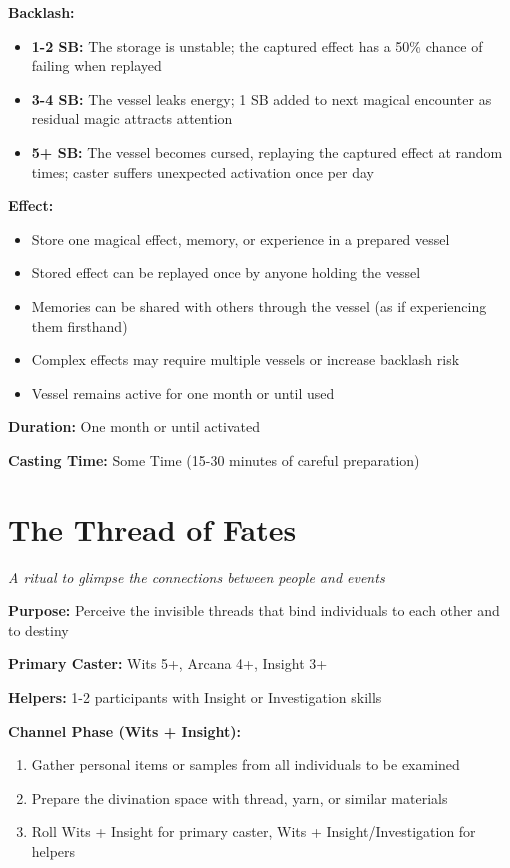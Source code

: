 \textbf{Backlash:}
\begin{itemize}
\item \textbf{1-2 SB:} The storage is unstable; the captured effect has a 50\% chance of failing when replayed
\item \textbf{3-4 SB:} The vessel leaks energy; 1 SB added to next magical encounter as residual magic attracts attention
\item \textbf{5+ SB:} The vessel becomes cursed, replaying the captured effect at random times; caster suffers unexpected activation once per day
\end{itemize}

\textbf{Effect:}
\begin{itemize}
\item Store one magical effect, memory, or experience in a prepared vessel
\item Stored effect can be replayed once by anyone holding the vessel
\item Memories can be shared with others through the vessel (as if experiencing them firsthand)
\item Complex effects may require multiple vessels or increase backlash risk
\item Vessel remains active for one month or until used
\end{itemize}

\textbf{Duration:} One month or until activated

\textbf{Casting Time:} Some Time (15-30 minutes of careful preparation)

\section*{The Thread of Fates}
\textit{A ritual to glimpse the connections between people and events}

\textbf{Purpose:} Perceive the invisible threads that bind individuals to each other and to destiny

\textbf{Primary Caster:} Wits 5+, Arcana 4+, Insight 3+

\textbf{Helpers:} 1-2 participants with Insight or Investigation skills

\textbf{Channel Phase (Wits + Insight):}
\begin{enumerate}
\item Gather personal items or samples from all individuals to be examined
\item Prepare the divination space with thread, yarn, or similar materials
\item Roll Wits + Insight for primary caster, Wits + Insight/Investigation for helpers
\end{enumerate}

